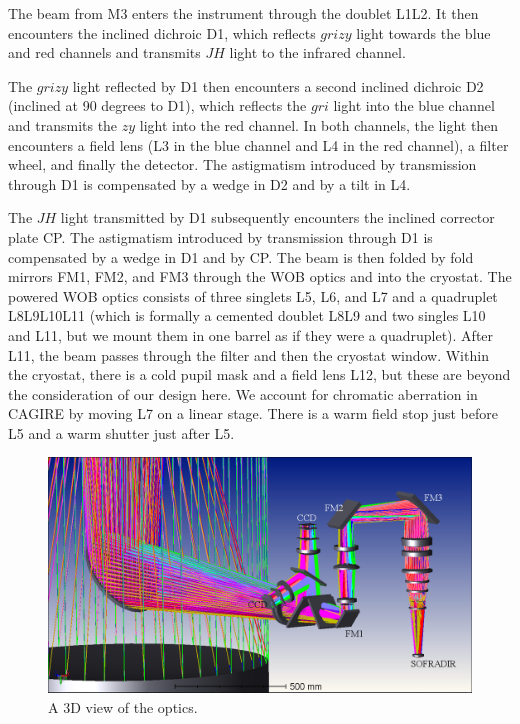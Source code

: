 \documentclass{report}
\begin{document}
The beam from M3 enters the instrument through the doublet L1L2. It then encounters the inclined dichroic D1, which reflects $grizy$ light towards the blue and red channels and transmits $JH$ light to the infrared channel.

The $grizy$ light reflected by D1 then encounters a second inclined dichroic D2 (inclined at 90 degrees to D1), which reflects the $gri$ light into the blue channel and transmits the $zy$ light into the red channel. In both channels, the light then encounters a field lens (L3 in the blue channel and L4 in the red channel), a filter wheel, and finally the detector. The astigmatism introduced by transmission through D1 is compensated by a wedge in D2 and by a tilt in L4.

The $JH$ light transmitted by D1 subsequently encounters the inclined corrector plate CP. The astigmatism introduced by transmission through D1 is compensated by a wedge in D1 and by CP. The beam is then folded by fold mirrors FM1, FM2, and FM3 through the WOB optics and into the cryostat. The powered WOB optics consists of three singlets L5, L6, and L7 and a quadruplet L8L9L10L11 (which is formally a cemented doublet L8L9 and two singles L10 and L11, but we mount them in one barrel as if they were a quadruplet). After L11, the beam passes through the filter and then the cryostat window. Within the cryostat, there is a cold pupil mask and a field lens L12, but these are beyond the consideration of our design here. We account for chromatic aberration in CAGIRE by moving L7 on a linear stage. There is a warm field stop just before L5 and a warm shutter just after L5.

\begin{figure}
\centering
\includegraphics[width=0.7\linewidth]{figures/LAYOUT_3D.png}
\caption{A 3D view of the optics.}
\label{figure:optics-layout-3d}
\end{figure}
\end{document}
